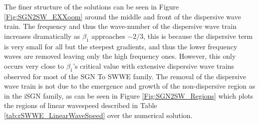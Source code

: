 \documentclass[10pt]{elsarticle}
\begin{document}
The finer structure of the solutions can be seen in Figure \ref{Fig:SGN2SW_EXXoom} around the middle and front of the dispersive wave train. The frequency and thus the wave-number of the dispersive wave train increases dramatically as $\beta_1$ approaches $-2/3$, this is because the dispersive term is very small for all but the steepest gradients, and thus the lower frequency waves are removed leaving only the high frequency ones. However, this only occurs very close to $\beta_1$'s critical value with extensive dispersive wave trains observed for most of the SGN To SWWE family. The removal of the dispersive wave train is not due to the emergence and growth of the non-dispersive region as in the iSGN family, as can be seen in Figure \ref{Fig:SGN2SW_Regions} which plots the regions of linear wavespeed described in Table \ref{tab:rSWWE_LinearWaveSpeed} over the numerical solution. 
%
\end{document}
